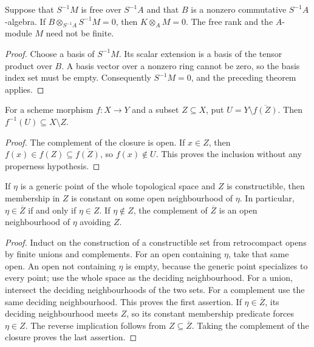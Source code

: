 \begin{theorem}\label{thm:kn-relative-arithmetic-free-fibre-generic-vanishing}
\leanok
{}
Suppose that $S^{-1}M$ is free over $S^{-1}A$ and that $B$ is a nonzero
commutative $S^{-1}A$-algebra.  If
$B\otimes_{S^{-1}A}S^{-1}M=0$, then $K\otimes_A M=0$.
The free rank and the $A$-module $M$ need not be finite.
\end{theorem}
\begin{proof}
Choose a basis of $S^{-1}M$.  Its scalar extension is a basis of the
tensor product over $B$.  A basis vector over a nonzero ring cannot be
zero, so the basis index set must be empty.  Consequently $S^{-1}M=0$,
and the preceding theorem applies.
\end{proof}

\begin{definition}\label{def:kn-relative-arithmetic-avoiding-open}
\leanok
For a scheme morphism $f:X\to Y$ and a subset $Z\subseteq X$, put
$U=Y\setminus\overline{f(Z)}$.  Then $f^{-1}(U)\subseteq X\setminus Z$.
\end{definition}
\begin{proof}
The complement of the closure is open.  If $x\in Z$, then
$f(x)\in f(Z)\subseteq\overline{f(Z)}$, so $f(x)\notin U$.
This proves the inclusion without any properness hypothesis.
\end{proof}

\begin{lemma}\label{lem:kn-arithmetic-constructible-generic-closure}
\leanok
If $\eta$ is a generic point of the whole topological space and $Z$ is
constructible, then membership in $Z$ is constant on some open
neighbourhood of $\eta$.  In particular, $\eta\in\overline Z$ if and
only if $\eta\in Z$.  If $\eta\notin Z$, the complement of $\overline Z$
is an open neighbourhood of $\eta$ avoiding $Z$.
\end{lemma}
\begin{proof}
Induct on the construction of a constructible set from retrocompact
opens by finite unions and complements.  For an open containing $\eta$,
take that same open.  An open not containing $\eta$ is empty, because
the generic point specializes to every point; use the whole space as
the deciding neighbourhood.  For a union, intersect the deciding
neighbourhoods of the two sets.  For a complement use the same deciding
neighbourhood.  This proves the first assertion.  If $\eta\in\overline Z$,
its deciding neighbourhood meets $Z$, so its constant membership
predicate forces $\eta\in Z$.  The reverse implication follows from
$Z\subseteq\overline Z$.  Taking the complement of the closure proves
the last assertion.
\end{proof}

